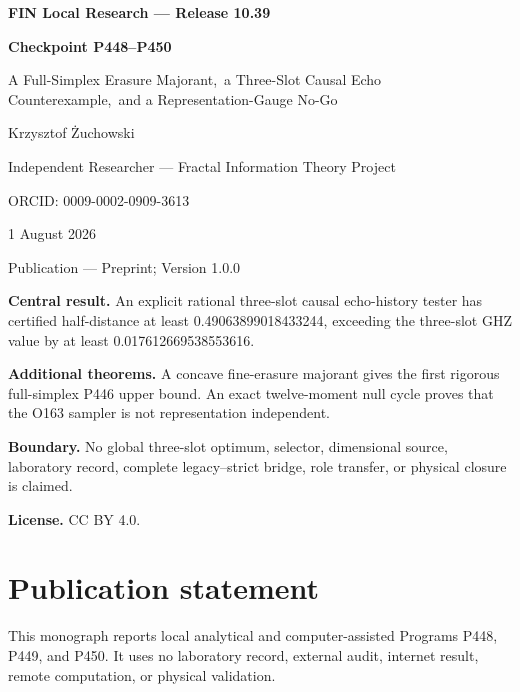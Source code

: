 \documentclass[11pt,a4paper,openany]{report}
\begin{document}
\hypersetup{pageanchor=false}
\begin{titlepage}
\centering
\vspace*{8mm}
{\Large\bfseries FIN Local Research --- Release 10.39\par}
\vspace{10mm}
{\Huge\bfseries Checkpoint P448--P450\par}
\vspace{6mm}
{\Large A Full-Simplex Erasure Majorant,\
a Three-Slot Causal Echo Counterexample,\
and a Representation-Gauge No-Go\par}
\vspace{14mm}
{\Large Krzysztof \.Zuchowski\par}
\vspace{2mm}
{\normalsize Independent Researcher --- Fractal Information Theory Project\par}
\vspace{2mm}
{\normalsize ORCID: 0009-0002-0909-3613\par}
\vspace{8mm}
{\large 1 August 2026\par}
{\normalsize Publication --- Preprint; Version 1.0.0\par}
\vfill
\begin{minipage}{0.92\textwidth}
\small
\textbf{Central result.}
An explicit rational three-slot causal echo-history tester has certified
half-distance at least 0.49063899018433244, exceeding the three-slot GHZ
value by at least 0.017612669538553616.

\medskip
\textbf{Additional theorems.}
A concave fine-erasure majorant gives the first rigorous full-simplex P446
upper bound.  An exact twelve-moment null cycle proves that the O163 sampler
is not representation independent.

\medskip
\textbf{Boundary.}
No global three-slot optimum, selector, dimensional source, laboratory
record, complete legacy--strict bridge, role transfer, or physical closure
is claimed.

\medskip
\textbf{License.} CC BY 4.0.
\end{minipage}
\vfill
\end{titlepage}
\hypersetup{pageanchor=true}
\chapter*{Publication statement}
This monograph reports local analytical and computer-assisted Programs P448,
P449, and P450.  It uses no laboratory record, external audit, internet
result, remote computation, or physical validation.
\tableofcontents
\clearpage
{}
\end{document}

